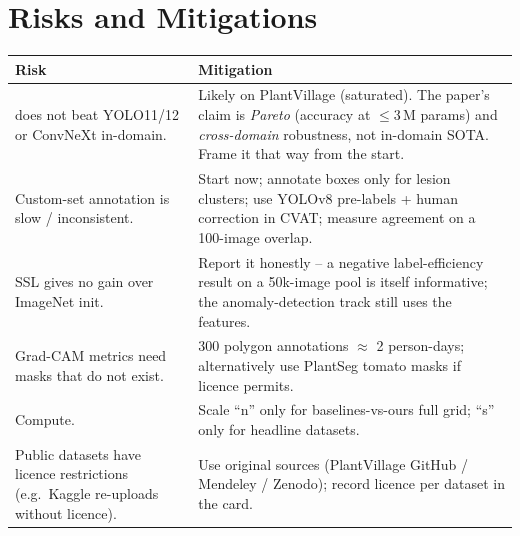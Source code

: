 \section{Risks and Mitigations}
\label{sec:risks}
\begin{tabular}{@{}L{5.2cm}L{10.8cm}@{}}
\toprule
Risk & Mitigation \\
\midrule
\model{} does not beat YOLO11/12 or ConvNeXt in-domain. & Likely on PlantVillage (saturated). The paper's claim is \emph{Pareto} (accuracy at $\le 3$\,M params) and \emph{cross-domain} robustness, not in-domain SOTA. Frame it that way from the start. \\
Custom-set annotation is slow / inconsistent. & Start now; annotate boxes only for lesion clusters; use YOLOv8 pre-labels + human correction in CVAT; measure agreement on a 100-image overlap. \\
SSL gives no gain over ImageNet init. & Report it honestly -- a negative label-efficiency result on a 50k-image pool is itself informative; the anomaly-detection track still uses the features. \\
Grad-CAM metrics need masks that do not exist. & 300 polygon annotations $\approx$ 2 person-days; alternatively use PlantSeg tomato masks if licence permits. \\
Compute. & Scale ``n'' only for baselines-vs-ours full grid; ``s'' only for headline datasets. \\
Public datasets have licence restrictions (e.g.\ Kaggle re-uploads without licence). & Use original sources (PlantVillage GitHub / Mendeley / Zenodo); record licence per dataset in the card. \\
\bottomrule
\end{tabular}
